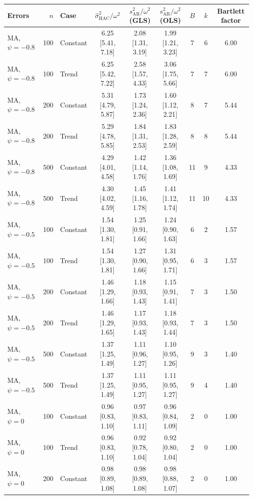\begin{tabular}{lrlcccccc}
\toprule
Errors & $n$ & Case & $\hat\sigma^2_{\mathrm{HAC}}/\omega^2$ & $s^2_{\mathrm{AR}}/\omega^2$ (GLS) & $s^2_{\mathrm{AR}}/\omega^2$ (OLS) & $B$ & $k$ & Bartlett factor \\
\midrule
MA, $\psi = -0.8$ & 100 & Constant & 6.25 [5.41, 7.18] & 2.08 [1.31, 3.19] & 1.99 [1.21, 3.23] & 7 & 6 & 6.00 \\
MA, $\psi = -0.8$ & 100 & Trend & 6.25 [5.42, 7.22] & 2.58 [1.57, 4.33] & 3.06 [1.75, 5.66] & 7 & 7 & 6.00 \\
MA, $\psi = -0.8$ & 200 & Constant & 5.31 [4.79, 5.87] & 1.73 [1.24, 2.36] & 1.60 [1.12, 2.21] & 8 & 7 & 5.44 \\
MA, $\psi = -0.8$ & 200 & Trend & 5.29 [4.78, 5.85] & 1.84 [1.31, 2.53] & 1.83 [1.28, 2.59] & 8 & 8 & 5.44 \\
MA, $\psi = -0.8$ & 500 & Constant & 4.29 [4.01, 4.58] & 1.42 [1.14, 1.76] & 1.36 [1.08, 1.69] & 11 & 9 & 4.33 \\
MA, $\psi = -0.8$ & 500 & Trend & 4.30 [4.02, 4.59] & 1.45 [1.16, 1.78] & 1.41 [1.12, 1.74] & 11 & 10 & 4.33 \\
\addlinespace
MA, $\psi = -0.5$ & 100 & Constant & 1.54 [1.30, 1.81] & 1.25 [0.91, 1.66] & 1.24 [0.90, 1.63] & 6 & 2 & 1.57 \\
MA, $\psi = -0.5$ & 100 & Trend & 1.54 [1.30, 1.81] & 1.27 [0.90, 1.66] & 1.31 [0.95, 1.71] & 6 & 3 & 1.57 \\
MA, $\psi = -0.5$ & 200 & Constant & 1.46 [1.29, 1.66] & 1.18 [0.93, 1.43] & 1.15 [0.91, 1.41] & 7 & 3 & 1.50 \\
MA, $\psi = -0.5$ & 200 & Trend & 1.46 [1.29, 1.65] & 1.17 [0.93, 1.43] & 1.18 [0.93, 1.44] & 7 & 3 & 1.50 \\
MA, $\psi = -0.5$ & 500 & Constant & 1.37 [1.25, 1.49] & 1.11 [0.96, 1.27] & 1.10 [0.95, 1.26] & 9 & 3 & 1.40 \\
MA, $\psi = -0.5$ & 500 & Trend & 1.37 [1.25, 1.49] & 1.11 [0.95, 1.27] & 1.11 [0.95, 1.27] & 9 & 4 & 1.40 \\
\addlinespace
MA, $\psi = 0$ & 100 & Constant & 0.96 [0.83, 1.10] & 0.97 [0.83, 1.11] & 0.96 [0.84, 1.09] & 2 & 0 & 1.00 \\
MA, $\psi = 0$ & 100 & Trend & 0.96 [0.83, 1.10] & 0.92 [0.78, 1.04] & 0.92 [0.80, 1.04] & 2 & 0 & 1.00 \\
MA, $\psi = 0$ & 200 & Constant & 0.98 [0.89, 1.08] & 0.98 [0.89, 1.08] & 0.98 [0.88, 1.07] & 2 & 0 & 1.00 \\

\end{tabular}
